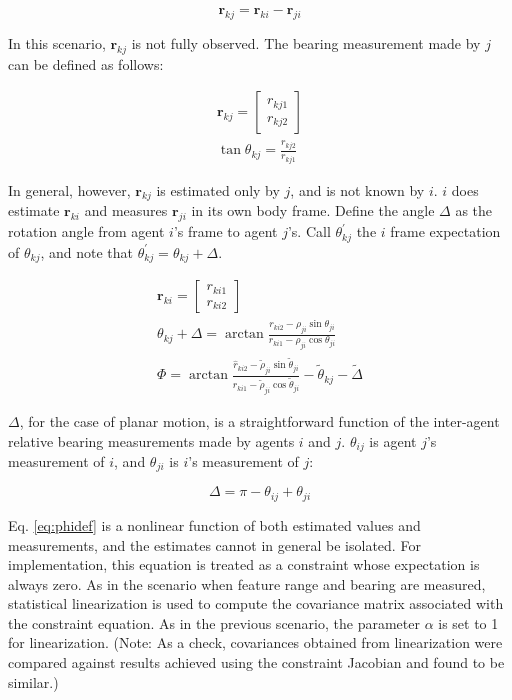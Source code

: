 \documentclass{aiaa-tc}
\newcommand{\B}[1]{\textbf{#1}} %
\begin{document}
\begin{equation}
\B{r}_{kj} = \B{r}_{ki} - \B{r}_{ji}
\end{equation}

In this scenario, $\B{r}_{kj}$ is not fully observed. The bearing measurement made by $j$ can be defined as follows:

\begin{align}
\B{r}_{kj} = \begin{bmatrix}
r_{kj1} \\
r_{kj2}
\end{bmatrix}\\
\tan{\theta_{kj}} = \frac{r_{kj2}}{r_{kj1}}
\end{align}

In general, however, $\B{r}_{kj}$ is estimated only by $j$, and is not known by $i$. $i$ does estimate $\B{r}_{ki}$ and measures $\B{r}_{ji}$ in its own body frame. Define the angle $\Delta$ as the rotation angle from agent $i$'s frame to agent $j$'s. Call $\theta_{kj}^{'}$ the $i$ frame expectation of $\theta_{kj}$, and note that $\theta_{kj}^{'} = \theta_{kj} + \Delta$.

\begin{align}
\B{r}_{ki} = \begin{bmatrix}
r_{ki1} \\r_{ki2}
\end{bmatrix}\\
\theta_{kj} + \Delta = \arctan{ \frac{r_{ki2} - \rho_{ji}\sin{\theta_{ji}}}{r_{ki1} - \rho_{ji}\cos{\theta_{ji}}} }\\
\Phi = \arctan{ \frac{\hat{r}_{ki2} - \tilde{\rho}_{ji}\sin{\tilde{\theta}_{ji}}}{\hat{r}_{ki1} - \tilde{\rho}_{ji}\cos{\tilde{\theta}_{ji}}} } - \tilde{\theta}_{kj} - \tilde{\Delta} \label{eq:phidef}
\end{align}

$\Delta$, for the case of planar motion, is a straightforward function of the inter-agent relative bearing measurements made by agents $i$ and $j$. $\theta_{ij}$ is agent $j$'s measurement of $i$, and $\theta_{ji}$ is $i$'s measurement of $j$:

\begin{equation}
\Delta = \pi - \theta_{ij} + \theta_{ji}
\end{equation}

Eq. \ref{eq:phidef} is a nonlinear function of both estimated values and measurements, and the estimates cannot in general be isolated. For implementation, this equation is treated as a constraint whose expectation is always zero. As in the scenario when feature range and bearing are measured, statistical linearization is used to compute the covariance matrix associated with the constraint equation. As in the previous scenario, the parameter $\alpha$ is set to 1 for linearization. (Note: As a check, covariances obtained from linearization were compared against results achieved using the constraint Jacobian and found to be similar.)
\end{document}
